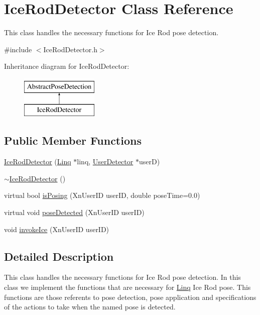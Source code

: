 \hypertarget{classIceRodDetector}{
\section{IceRodDetector Class Reference}
\label{classIceRodDetector}
}


This class handles the necessary functions for Ice Rod pose detection.  




{\ttfamily \#include $<$IceRodDetector.h$>$}

Inheritance diagram for IceRodDetector:\begin{figure}[H]
\begin{center}
\leavevmode
\includegraphics[height=2cm]{classIceRodDetector}
\end{center}
\end{figure}
\subsection*{Public Member Functions}
\begin{DoxyCompactItemize}
\item 
\hyperlink{classIceRodDetector_a1685f8a0502d55e9ab1c5b08c27c286d}{IceRodDetector} (\hyperlink{classLinq}{Linq} $\ast$linq, \hyperlink{classUserDetector}{UserDetector} $\ast$userD)
\item 
\hyperlink{classIceRodDetector_ab4f8fa8f698cc77b09d80605c50659a6}{$\sim$IceRodDetector} ()
\item 
virtual bool \hyperlink{classIceRodDetector_a81a33e1302a9f8336d6e8bf49c421e2a}{isPosing} (XnUserID userID, double poseTime=0.0)
\item 
virtual void \hyperlink{classIceRodDetector_aa2ef806316f44c93ea43f0b937c082fc}{poseDetected} (XnUserID userID)
\item 
void \hyperlink{classIceRodDetector_a91498b2cb7bcfa6dd0fe4dae60b50d40}{invokeIce} (XnUserID userID)
\end{DoxyCompactItemize}


\subsection{Detailed Description}
This class handles the necessary functions for Ice Rod pose detection. In this class we implement the functions that are necessary for \hyperlink{classLinq}{Linq} Ice Rod pose. This functions are those referents to pose detection, pose application and specifications of the actions to take when the named pose is detected.

